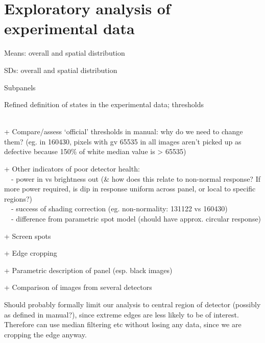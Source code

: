 \documentclass[\main/IO-Pixels.tex]{subfiles}
\begin{document}
\section{Exploratory analysis of experimental data}
\begin{outline}
Means: overall and spatial distribution

SDs: overall and spatial distribution

Subpanels

Refined definition of states in the experimental data; thresholds

\\
+ Compare/assess `official' thresholds in manual: why do we need to change them? (eg. in 160430, pixels with gv 65535 in all images aren't picked up as defective because 150\% of white median value is > 65535) 

+ Other indicators of poor detector health: \\ \-\  \-\ - power in vs brightness out (\& how does this relate to non-normal response? If more power required, is dip in response uniform across panel, or local to specific regions?) \\ \-\  \-\ - success of shading correction (eg. non-normality: 131122 vs 160430) \\\-\  \-\ - difference from parametric spot model (should have approx. circular response)

+ Screen spots

+ Edge cropping

+ Parametric description of panel (esp. black images)

+ Comparison of images from several detectors


\end{outline}

Should probably formally limit our analysis to central region of detector (possibly as defined in manual?), since extreme edges are less likely to be of interest. Therefore can use median filtering etc without losing any data, since we are cropping the edge anyway.
\end{document}
